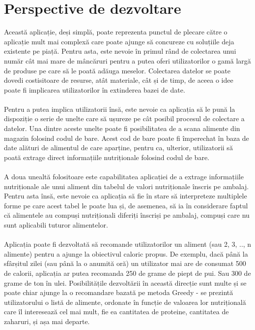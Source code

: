 \section{Perspective de dezvoltare}
Această aplicație, deși simplă, poate reprezenta punctul de plecare către o aplicație mult mai complexă care poate ajunge să concureze cu soluțiile deja existente pe piață. Pentru asta, este nevoie în primul rând de colectarea unui număr cât mai mare de mâncăruri pentru a putea oferi utilizatorilor o gamă largă de produse pe care să le poată adăuga meselor.
Colectarea datelor se poate dovedi costisitoare de resurse, atât materiale, cât și de timp, de aceea o idee poate fi implicarea utilizatorilor în extinderea bazei de date.
\\ \\
Pentru a putea implica utilizatorii însă, este nevoie ca aplicația să le pună la dispoziție o serie de unelte care să ușureze pe cât posibil procesul de colectare a datelor. Una dintre aceste unelte poate fi posibilitatea de a scana alimente din magazin folosind codul de bare. Acest cod de bare poate fi împerechat în baza de date alături de alimentul de care aparține, pentru ca, ulterior, utilizatorii să poată extrage direct informațiile nutriționale folosind codul de bare.
\\ \\
A doua unealtă folositoare este capabilitatea aplicației de a extrage informațiile nutriționale ale unui aliment din tabelul de valori nutriționale înscris pe ambalaj. Pentru asta însă, este nevoie ca aplicația să fie în stare să interpreteze multiplele forme pe care acest tabel le poate lua și, de asemenea, să ia în considerare faptul că alimentele au compuși nutriționali diferiți înscriși pe ambalaj, compuși care nu sunt aplicabili tuturor alimentelor.
\\ \\
Aplicația poate fi dezvoltată să recomande utilizatorilor un aliment (sau 2, 3, .., n alimente) pentru a ajunge la obiectivul caloric propus. De exemplu, dacă până la sfârșitul zilei (sau până la o anumită oră) un utilizator mai are de consumat 500 de calorii, aplicația ar putea recomanda 250 de grame de piept de pui. Sau 300 de grame de ton în ulei. Posibilitățile dezvoltării în această direcție sunt multe și se poate chiar ajunge la o recomandare bazată pe metoda Greedy - se prezintă utilizatorului o listă de alimente, ordonate în funcție de valoarea lor nutrițională care îl interesează cel mai mult, fie ea cantitatea de proteine, cantitatea de zaharuri, și așa mai departe.
